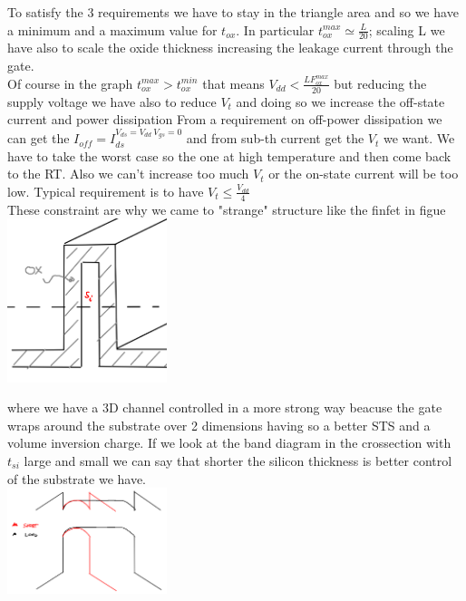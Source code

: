 To satisfy the 3 requirements we have to stay in the triangle area and so we have a minimum and a maximum value for $t_{ox}$. In particular $t_{ox}^{max}\simeq \frac{L}{20}$; scaling L we have also to scale the oxide thickness increasing the leakage current through the gate.\\

\vspace{5mm}
Of course in the graph $t_{ox}^{max}>t_{ox}^{min}$ that means $V_{dd}<\frac{LF_{ox}^{max}}{20}$ but reducing the supply voltage we have also to reduce $V_t$ and doing so we increase the off-state current and power dissipation
From a requirement on off-power dissipation we can get the $I_{off}=I_{ds}^{V_{ds}=V_{dd} \ V_{gs}=0}$ and from sub-th current get the $V_t$ we want. We have to take the worst case so the one at high temperature and then come back to the RT. Also we can't increase too much $V_t$ or the on-state current will be too low. Typical requirement is to have $V_t \le \frac{V_{dd}}{4}$\\

These constraint are why we came to "strange" structure like the finfet in figue \\

\centering
\includegraphics[width=0.35\textwidth]{finfet.png}\\
\raggedright

where we have a 3D channel controlled in a more strong way beacuse the gate wraps around the substrate over 2 dimensions having so a better STS and a volume inversion charge.
If we look at the band diagram in the crossection with $t_{si}$ large and small we can say that shorter the silicon thickness is better control of the substrate we have.\\

\centering
\includegraphics[width=0.35\textwidth]{finfetbd.png}\\
\raggedright

